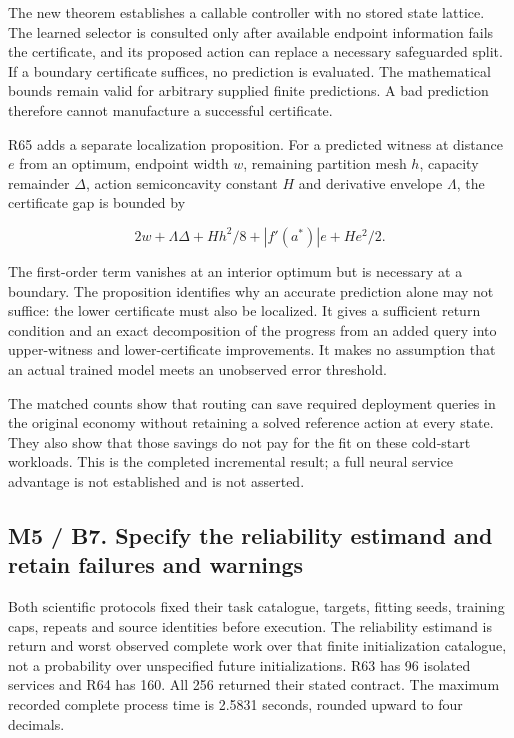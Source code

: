 The new theorem establishes a callable controller with no stored state
lattice. The learned selector is consulted only after available endpoint
information fails the certificate, and its proposed action can replace a
necessary safeguarded split. If a boundary certificate suffices, no
prediction is evaluated. The mathematical bounds remain valid for
arbitrary supplied finite predictions. A bad prediction therefore cannot
manufacture a successful certificate.

R65 adds a separate localization proposition. For a predicted witness at
distance \(e\) from an optimum, endpoint width \(w\), remaining
partition mesh \(h\), capacity remainder \(\Delta\), action
semiconcavity constant \(H\) and derivative envelope \(\Lambda\), the
certificate gap is bounded by

\[
2w+\Lambda\Delta+Hh^2/8+|f'(a^*)|e+He^2/2.
\]

The first-order term vanishes at an interior optimum but is necessary at
a boundary. The proposition identifies why an accurate prediction alone
may not suffice: the lower certificate must also be localized. It gives
a sufficient return condition and an exact decomposition of the progress
from an added query into upper-witness and lower-certificate
improvements. It makes no assumption that an actual trained model meets
an unobserved error threshold.

The matched counts show that routing can save required deployment
queries in the original economy without retaining a solved reference
action at every state. They also show that those savings do not pay for
the fit on these cold-start workloads. This is the completed incremental
result; a full neural service advantage is not established and is not
asserted.

\hypertarget{m5-b7.-specify-the-reliability-estimand-and-retain-failures-and-warnings}{%
\subsection{M5 / B7. Specify the reliability estimand and retain
failures and
warnings}\label{m5-b7.-specify-the-reliability-estimand-and-retain-failures-and-warnings}}

Both scientific protocols fixed their task catalogue, targets, fitting
seeds, training caps, repeats and source identities before execution.
The reliability estimand is return and worst observed complete work over
that finite initialization catalogue, not a probability over unspecified
future initializations. R63 has 96 isolated services and R64 has 160.
All 256 returned their stated contract. The maximum recorded complete
process time is 2.5831 seconds, rounded upward to four decimals.

